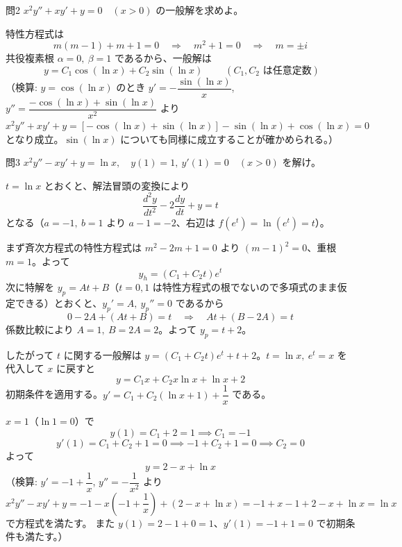 \documentclass[a4paper,11pt]{article}
\begin{document}
\clearpage
\begin{mondaiboxS}{問2}
$x^{2}y'' + xy' + y = 0 \quad (x>0)$ の一般解を求めよ。
\end{mondaiboxS}
\kaitou
特性方程式は
\[
m(m-1) + m + 1 = 0
\quad\Longrightarrow\quad
m^{2} + 1 = 0
\quad\Longrightarrow\quad
m = \pm i
\]
共役複素根 $\alpha = 0,\ \beta = 1$ であるから、一般解は
\[
\boxed{\; y = C_{1}\cos(\ln x) + C_{2}\sin(\ln x) \;}
\qquad (C_{1}, C_{2} \text{ は任意定数})
\]
（検算: $y=\cos(\ln x)$ のとき $y' = -\dfrac{\sin(\ln x)}{x}$, $y'' = \dfrac{-\cos(\ln x) + \sin(\ln x)}{x^{2}}$ より
$x^{2}y''+xy'+y = \left[-\cos(\ln x)+\sin(\ln x)\right] - \sin(\ln x) + \cos(\ln x) = 0$ となり成立。$\sin(\ln x)$ についても同様に成立することが確かめられる。）

\clearpage
\begin{mondaiboxS}{問3}
$x^{2}y'' - xy' + y = \ln x, \quad y(1) = 1,\ y'(1) = 0 \quad (x>0)$ を解け。
\end{mondaiboxS}
\kaitou
$t = \ln x$ とおくと、解法冒頭の変換により
\[
\frac{d^{2}y}{dt^{2}} - 2\frac{dy}{dt} + y = t
\]
となる（$a=-1,\ b=1$ より $a-1=-2$、右辺は $f(e^{t}) = \ln(e^{t}) = t$）。

まず斉次方程式の特性方程式は $m^{2}-2m+1=0$ より $(m-1)^{2}=0$、重根 $m=1$。よって
\[
y_{h} = (C_{1}+C_{2}t)e^{t}
\]
次に特解を $y_{p} = At+B$（$t=0,1$ は特性方程式の根でないので多項式のまま仮定できる）とおくと、$y_{p}'=A,\ y_{p}''=0$ であるから
\[
0 - 2A + (At+B) = t
\quad\Longrightarrow\quad
At + (B-2A) = t
\]
係数比較により $A=1,\ B=2A=2$。よって $y_{p} = t+2$。

したがって $t$ に関する一般解は $y = (C_{1}+C_{2}t)e^{t} + t + 2$。$t=\ln x,\ e^{t}=x$ を代入して $x$ に戻すと
\[
y = C_{1}x + C_{2}x\ln x + \ln x + 2
\]
初期条件を適用する。$y' = C_{1} + C_{2}(\ln x + 1) + \dfrac{1}{x}$ である。

$x=1$（$\ln 1 = 0$）で
\[
y(1) = C_{1} + 2 = 1 \implies C_{1} = -1
\]
\[
y'(1) = C_{1} + C_{2} + 1 = 0 \implies -1 + C_{2} + 1 = 0 \implies C_{2} = 0
\]
よって
\[
\boxed{\; y = 2 - x + \ln x \;}
\]
（検算: $y'=-1+\dfrac{1}{x}$, $y''=-\dfrac{1}{x^{2}}$ より
$x^{2}y'' - xy' + y = -1 - x\left(-1+\dfrac{1}{x}\right) + (2-x+\ln x) = -1 + x - 1 + 2 - x + \ln x = \ln x$ で方程式を満たす。
また $y(1)=2-1+0=1$、$y'(1)=-1+1=0$ で初期条件も満たす。）
\end{document}
